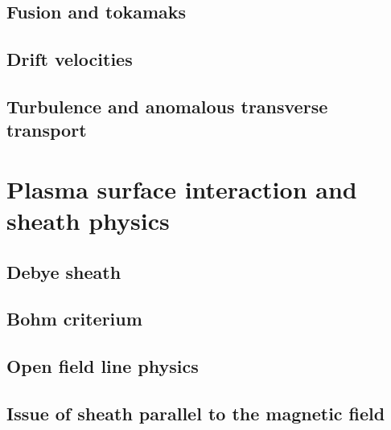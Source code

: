 		\subsection{Fusion and tokamaks}
		\subsection{Drift velocities}
		\subsection{Turbulence and anomalous transverse transport}
	\section{Plasma surface interaction and sheath physics}
		\subsection{Debye sheath}
		\subsection{Bohm criterium}
		\subsection{Open field line physics}
		\subsection{Issue of sheath parallel to the magnetic field}

		